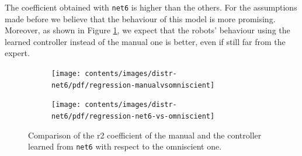 The coefficient obtained with \texttt{net6} is higher than the others. For the 
assumptions made before we believe that the behaviour of this model is more 
promising. Moreover, as shown in Figure \ref{fig:net6r2}, we expect that the 
robots’ behaviour using the learned controller instead of the manual one is 
better, even if still far from the expert.

\begin{figure}[!htb]
	\centering
	\begin{subfigure}[h]{0.49\textwidth}
		\centering
		\texttt{[image: contents/images/distr-net6/pdf/regression-manualvsomniscient]}%
	\end{subfigure}
	\hfill
	\begin{subfigure}[h]{0.49\textwidth}
		\centering
		\texttt{[image: contents/images/distr-net6/pdf/regression-net6-vs-omniscient]}
	\end{subfigure}
	\caption[Evaluation of the \gls{r2} coefficients of \texttt{net6} 
	.]{Comparison of 
	the \gls{r2} coefficient of the manual and the controller 
	learned from \texttt{net6} with respect to the omniscient one.}
	\label{fig:net6r2}
\end{figure}

